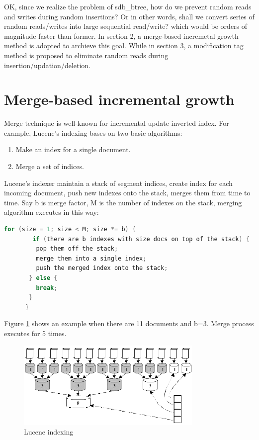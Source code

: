 \documentclass[a4paper,10pt]{article}
\begin{document}
OK, since we realize the problem of sdb\_btree, how do we prevent random reads and writes during random insertions? Or in other words, shall we convert series of random reads/writes into large sequential read/write?
which would be orders of magnitude faster than former. In section 2, a merge-based incremetal growth method is adopted to archieve this goal.
While in section 3, a modification tag method is proposed to eliminate random reads during insertion/updation/deletion.

\section{Merge-based incremental growth}

Merge technique is well-known for incremental update inverted index. For example, Lucene's indexing bases on two basic algorithms:
\begin{enumerate}
\item Make an index for a single document.
\item Merge a set of indices.
\end{enumerate}
Lucene's indexer maintain a stack of segment indices, create index for each incoming document, push new indexes onto the stack, merges them from time to time.
Say b is merge factor, M is the number of indexes on the stack, merging algorithm executes in this way:
\begin{lstlisting}[language=C]
      for (size = 1; size < M; size *= b) {
        if (there are b indexes with size docs on top of the stack) {
         pop them off the stack;
         merge them into a single index;
         push the merged index onto the stack;
       } else {
         break;
       }
      } 
\end{lstlisting}
Figure \ref{fig:indexing} shows an example when there are 11 documents and b=3. Merge process executes for 5 times.

\begin{figure}[H]\centering
\includegraphics[width=0.8\textwidth]{indexing.png}
\caption{Lucene indexing}\label{fig:indexing}
\end{figure}
\end{document}
